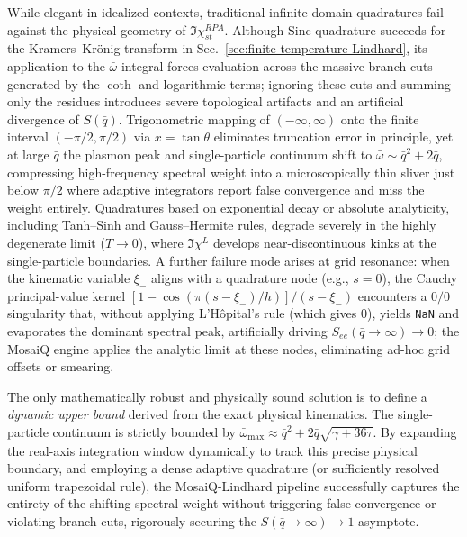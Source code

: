 \documentclass[aps,showkeys,noshowpacs,superscriptaddress,pre,preprint]{revtex4-2}
\begin{document}
While elegant in idealized contexts, traditional infinite-domain quadratures fail against the physical geometry of $\Im \chi_{st}^{RPA}$.
Although Sinc-quadrature succeeds for the Kramers--Kr\"onig transform in Sec.~\ref{sec:finite-temperature-Lindhard}, its application to the $\bar{\omega}$ integral forces evaluation across the massive branch cuts generated by the $\coth$ and logarithmic terms; ignoring these cuts and summing only the residues introduces severe topological artifacts and an artificial divergence of $S(\bar{q})$.
Trigonometric mapping of $(-\infty,\infty)$ onto the finite interval $(-\pi/2,\pi/2)$ via $x=\tan\theta$ eliminates truncation error in principle, yet at large $\bar{q}$ the plasmon peak and single-particle continuum shift to $\bar{\omega}\sim\bar{q}^2+2\bar{q}$, compressing high-frequency spectral weight into a microscopically thin sliver just below $\pi/2$ where adaptive integrators report false convergence and miss the weight entirely.
Quadratures based on exponential decay or absolute analyticity, including Tanh--Sinh and Gauss--Hermite rules, degrade severely in the highly degenerate limit ($T\to 0$), where $\Im\chi^L$ develops near-discontinuous kinks at the single-particle boundaries.
A further failure mode arises at grid resonance: when the kinematic variable $\xi_-$ aligns with a quadrature node (e.g., $s=0$), the Cauchy principal-value kernel $[1-\cos(\pi(s-\xi_-)/h)]/(s-\xi_-)$ encounters a $0/0$ singularity that, without applying L'H\^opital's rule (which gives $0$), yields \texttt{NaN} and evaporates the dominant spectral peak, artificially driving $S_{ee}(\bar{q}\to\infty)\to 0$; the MosaiQ engine applies the analytic limit at these nodes, eliminating ad-hoc grid offsets or smearing.

The only mathematically robust and physically sound solution is to define a \emph{dynamic upper bound} derived from the exact physical kinematics. The single-particle continuum is strictly bounded by $\bar{\omega}_{\max} \approx \bar{q}^2 + 2\bar{q}\sqrt{\gamma + 36\tau}$. By expanding the real-axis integration window dynamically to track this precise physical boundary, and employing a dense adaptive quadrature (or sufficiently resolved uniform trapezoidal rule), the MosaiQ-Lindhard pipeline successfully captures the entirety of the shifting spectral weight without triggering false convergence or violating branch cuts, rigorously securing the $S(\bar{q} \to \infty) \to 1$ asymptote.
\end{document}
